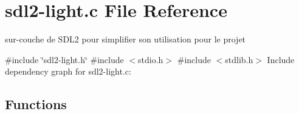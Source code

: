 \hypertarget{sdl2-light_8c}{}\section{sdl2-\/light.c File Reference}
\label{sdl2-light_8c}


sur-\/couche de S\+D\+L2 pour simplifier son utilisation pour le projet  


{\ttfamily \#include \char`\"{}sdl2-\/light.\+h\char`\"{}}\newline
{\ttfamily \#include $<$stdio.\+h$>$}\newline
{\ttfamily \#include $<$stdlib.\+h$>$}\newline
Include dependency graph for sdl2-\/light.c\+:
\subsection*{Functions}
